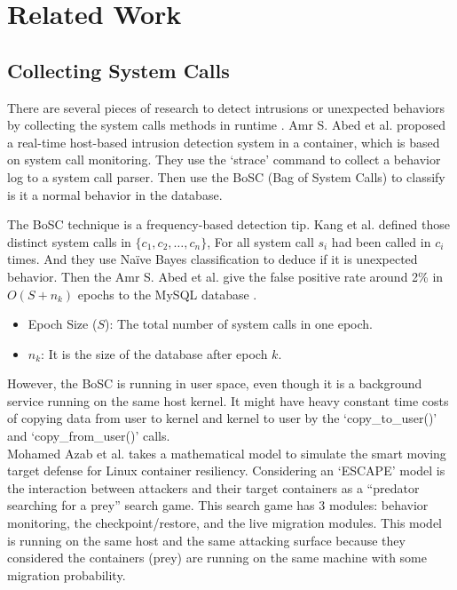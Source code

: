 \chapter{Related Work}

\section{Collecting System Calls}
There are several pieces of research to detect intrusions or unexpected behaviors
by collecting the system calls methods in runtime \cite{inproceedings,9307722,7809699,7796855}.
Amr S. Abed et al.\cite{inproceedings} proposed a real-time host-based intrusion
detection system in a container, which is based on system call monitoring. They use
the `strace' command to collect a behavior log to a system call parser. Then use the
BoSC (Bag of System Calls) \cite{1495942} to classify is it a normal behavior in
the database.

The BoSC technique is a frequency-based detection tip. Kang et al.\cite{1495942} defined
those distinct system calls in $\{c_1, c_2, \dots, c_n \}$, For all system call $s_i$
had been called in $c_i$ times. And they use Na\"ive Bayes classification to deduce if
it is unexpected behavior. Then the Amr S. Abed et al. give the false positive rate
around 2\% in $O(S+n_k)$ epochs to the MySQL database \cite{inproceedings}.
\begin{itemize}
    \item Epoch Size ($S$): The total number of system calls in one epoch.
    \item $n_k$: It is the size of the database after epoch $k$.
\end{itemize}
However, the BoSC is running in user space, even though it is a background service running
on the same host kernel. It might have heavy constant time costs of copying data from
user to kernel and kernel to user by the `copy\_to\_user()' and `copy\_from\_user()' calls.\\

Mohamed Azab et al.\cite{7809699,7796855} takes a mathematical model to simulate the
smart moving target defense for Linux container resiliency. Considering an `ESCAPE' model
is the interaction between attackers and their target containers as a “predator searching
for a prey” search game. This search game has 3 modules: behavior monitoring, the
checkpoint/restore, and the live migration modules.
This model is running on the same host and the same attacking surface because they considered
the containers (prey) are running on the same machine with some migration probability.

